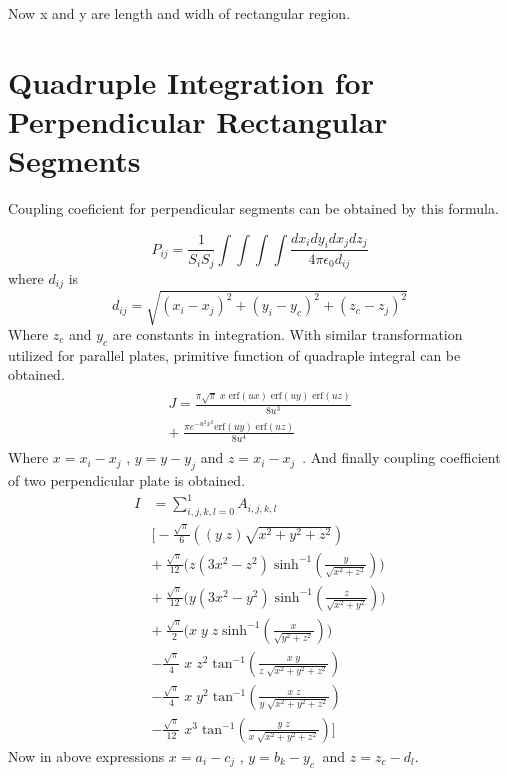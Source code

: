 \documentclass[twoside,twocolumn]{article}
\begin{document}
Now x and y are length and widh of rectangular region.
\section{Quadruple Integration for Perpendicular Rectangular Segments}
Coupling coeficient for perpendicular segments can be obtained by this formula.

\begin{equation}
\label {eq21}
P_{ij} = \frac 1 {S_i S_j}\int \int \int \int \frac{dx_i dy_i dx_j dz_j}{4 \pi \epsilon_0 d_{ij}}
\end{equation} 
where $d _{ij}$ is 
\begin{equation}
\label {eq22}
d_{ij} = \sqrt{(x_i-x_j)^2 + (y_i-y_c)^2 + (z_c - z_j)^2}
\end{equation} 
Where $z_c$ and $y_c$ are constants in integration. With similar transformation utilized for parallel plates, primitive function of quadraple integral can be obtained.
\begin{eqnarray}
\label {eq23}
\begin{array}{lll}

J = \frac{\pi\sqrt{\pi}\;x\; \mathrm {erf}(u x)\; \mathrm {erf}(u y)\; \mathrm {erf}(u z)}{8u^3}\\
+\; \frac{\pi e^{-u^2 x^2} \mathrm{erf}(u y)\; \mathrm{erf}(u z)}{8u^4}
\end{array}
\end{eqnarray}
Where $x = x_i - x_j$ , $y = y - y_j$ and $z = x_i - x_j$\ .
And finally coupling coefficient of two perpendicular plate is obtained.
\begin{equation}\label {eq:24}
\begin{array}{ll}
I& = \sum_{i,j,k,l=0}^1 A_{i,j,k,l}\\
&  \bigg[ -\frac {\sqrt{\pi} } {6} \left((y\; z)\sqrt{x^2 + y^2 + z^2} \right) \\

& +\  \frac {\sqrt{\pi} } {12} \bigg( z(3x^2 - z^2)\;\mathrm{sinh^{-1}}(\frac{y}{\sqrt{x^2 + z^2}}) \bigg)\\
& +\  \frac {\sqrt{\pi} } {12} \bigg( y(3x^2 - y^2)\;\mathrm{sinh^{-1}}(\frac{z}{\sqrt{x^2 + y^2}}) \bigg)\\
& +\  \frac {\sqrt{\pi} } {2} \bigg( x\; y\; z\;\mathrm{sinh^{-1}}(\frac{x}{\sqrt{y^2 + z^2}}) \bigg)\\
&-  \frac {\sqrt{\pi} } {4}\;x \;z^2\;\mathrm{tan^{-1}}(\frac{x\;y}{z\;\sqrt{x^2+y^2 + z^2}})\\

&-  \frac {\sqrt{\pi} } {4}\;x \;y^2\;\mathrm{tan^{-1}}(\frac{x\;z}{y\;\sqrt{x^2+y^2 + z^2}})\\
&-  \frac {\sqrt{\pi} } {12}\;x^3\;\mathrm{tan^{-1}}(\frac{y\;z}{x\;\sqrt{x^2+y^2 + z^2}})\bigg]


\end{array}
\end{equation}
Now in above expressions $x = a_i - c_j$ , $y = b_k - y_c\ $ and $z = z_c - d_l$.
\end{document}
